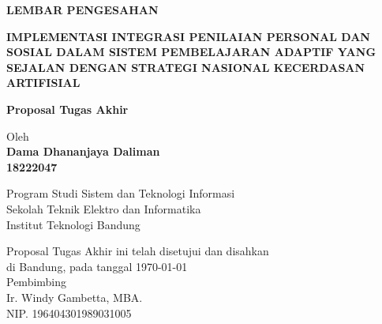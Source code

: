 \documentclass[12pt,a4paper,oneside]{book}
\begin{document}
\newpage
\thispagestyle{empty}
\begin{center}
  \textbf{\large LEMBAR PENGESAHAN}\\[1cm]
  \vspace*{1.5cm}
    
  {\large\bfseries\uppercase{Implementasi Integrasi Penilaian Personal dan Sosial dalam Sistem Pembelajaran Adaptif yang Sejalan dengan Strategi Nasional Kecerdasan Artifisial}}\\
     \vspace{2cm}

  {\Large \textbf{Proposal Tugas Akhir}}\\


  \vspace{1.5cm}
    
    
  {\large Oleh}\\[0.3cm]
    \textbf{
    {\large Dama Dhananjaya Daliman}\\
    {\large 18222047}
  }\\
    
  \vspace{0.5cm}
 
  {\large Program Studi Sistem dan Teknologi Informasi}\\
  {\large Sekolah Teknik Elektro dan Informatika}\\
  {\large Institut Teknologi Bandung}\\

  \vspace{1.5cm}

  Proposal Tugas Akhir ini telah disetujui dan disahkan\\ 
  di Bandung, pada tanggal \today\\[1cm]

	Pembimbing  \\[3cm]
	Ir. Windy Gambetta, MBA.   \\[0.2cm]
	NIP. 196404301989031005 

\end{center}

\vspace{1cm}
\noindent

\end{document}
